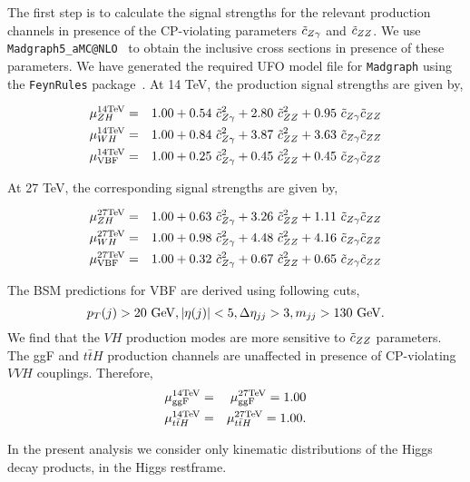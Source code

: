{
The first step is to calculate the signal strengths for the relevant production channels in presence of the CP-violating
parameters $\tilde c_{Z\gamma}$ and $\tilde c_{ZZ}$. We use {\tt Madgraph5\_aMC@NLO}~\cite{Alwall:2014hca} to obtain the inclusive cross sections in presence of these parameters. We have generated the required UFO model file for {\tt Madgraph} using the {\tt FeynRules} package~\cite{Degrande:2011ua,Alloul:2013bka}.  At 14 TeV, the production signal strengths are given by, }


\begin{eqnarray}\label{eq:mu14tev}
 \mu_{ZH}^{\rm 14 TeV} &=& 1.00 +  0.54~ \tilde c_{Z\gamma}^2 + 2.80~ \tilde c_{ZZ}^2 + 0.95~ \tilde c_{Z\gamma} \tilde c_{ZZ} \\
 \mu_{WH}^{\rm 14 TeV} &=& 1.00  + 0.84~ \tilde c_{Z\gamma}^2 + 3.87~ \tilde c_{ZZ}^2 
   + 3.63~\tilde c_{Z\gamma}\tilde c_{ZZ} \\
 \mu_{\rm VBF}^{\rm 14 TeV} &=& 1.00  + 0.25~ \tilde c_{Z\gamma}^2 + 0.45~ \tilde c_{ZZ}^2  
   + 0.45~\tilde c_{Z\gamma}\tilde c_{ZZ}
\end{eqnarray}




{ At 27 TeV, the corresponding signal strengths are given by,}

\begin{eqnarray}\label{eq:mu27tev}
 \mu_{ZH}^{\rm 27 TeV} &=& 1.00 +  0.63~ \tilde c_{Z\gamma}^2 + 3.26~ \tilde c_{ZZ}^2 + 1.11~ \tilde c_{Z\gamma} \tilde c_{ZZ} \\
 \mu_{WH}^{\rm 27 TeV} &=& 1.00 + 0.98~ \tilde c_{Z\gamma}^2 + 4.48~ \tilde c_{ZZ}^2 
  + 4.16~\tilde c_{Z\gamma}\tilde c_{ZZ} \\
 \mu_{\rm VBF}^{\rm 27 TeV} &=& 1.00  + 0.32~ \tilde c_{Z\gamma}^2 + 0.67~ \tilde c_{ZZ}^2  
  + 0.65~\tilde c_{Z\gamma}\tilde c_{ZZ}
\end{eqnarray}

The BSM predictions for VBF are derived using following cuts, 
\begin{equation}
 p_T(j) > 20~{\rm GeV}, |\eta(j)| < 5, \Delta\eta_{jj} > 3, m_{jj} > 130~{\rm GeV} \nonumber.
\end{equation}
We find that the $VH$ production modes are more sensitive to $\tilde c_{ZZ}$ parameters.
The ggF and $t{\bar t}H$ production channels are unaffected in presence of CP-violating $VVH$ 
couplings. Therefore, 
% 
\begin{eqnarray}
 \mu_{\rm ggF}^{\rm 14 TeV} &=& \mu_{\rm ggF}^{\rm 27 TeV} =  1.00 \\
 \mu_{t \bar t H}^{\rm 14 TeV} &=& \mu_{t\bar t H}^{\rm 27 TeV} =  1.00 .
\end{eqnarray}

{ In the present analysis we consider only kinematic distributions of the Higgs decay products, 
in the Higgs restframe.} \\

